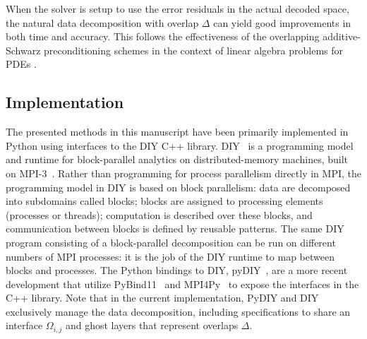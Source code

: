 \documentclass[conference]{IEEEtran}
\begin{document}

When the solver is setup to use the error residuals in the actual decoded space, the natural data decomposition with overlap $\Delta$ can yield good improvements in both time and accuracy. This follows the effectiveness of the overlapping additive-Schwarz preconditioning schemes in the context of linear algebra problems for PDEs \cite{smith-ddm} \cite{gander-rasm}. 



\subsection{Implementation}
\label{sec:implementation}

The presented methods in this manuscript have been primarily implemented in Python using interfaces to the DIY C++ library. DIY~\cite{morozov16} is a programming model and runtime
for block-parallel analytics on distributed-memory machines, built on MPI-3~\cite{dongarra13}.  Rather than programming
for process parallelism directly in MPI, the programming model in DIY is based on block parallelism: data are decomposed
into subdomains called blocks; blocks are assigned to processing elements (processes or threads); computation is
described over these blocks, and communication between blocks is defined by reusable patterns. The same DIY program
consisting of a block-parallel decomposition can be run on different numbers of MPI processes: it is the job of the DIY
runtime to map between blocks and processes. The Python bindings to DIY, pyDIY~\cite{pydiy},
are a more recent development that utilize PyBind11~\cite{jakob17} and MPI4Py~\cite{dalcin11} to expose the interfaces in the C++ library. Note that in the current implementation, PyDIY and DIY exclusively manage the data decomposition, including specifications to share an interface $\Omega_{i,j}$ and ghost layers that represent overlaps $\Delta$.
\end{document}
